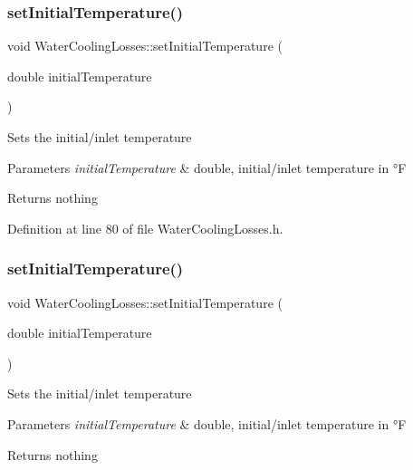\subsubsection{\texorpdfstring{set\+Initial\+Temperature()}{setInitialTemperature()}\hspace{0.1cm}{\footnotesize\ttfamily [2/3]}}
{\footnotesize\ttfamily void Water\+Cooling\+Losses\+::set\+Initial\+Temperature (\begin{DoxyParamCaption}\item[{double}]{initial\+Temperature }\end{DoxyParamCaption})\hspace{0.3cm}{\ttfamily [inline]}}

Sets the initial/inlet temperature


\begin{DoxyParams}{Parameters}
{\em initial\+Temperature} & double, initial/inlet temperature in °F\\
\hline
\end{DoxyParams}
\begin{DoxyReturn}{Returns}
nothing 
\end{DoxyReturn}


Definition at line 80 of file Water\+Cooling\+Losses.\+h.

\mbox{\label{class_water_cooling_losses_a56b0b64b71ecbece780622d5f4b536ba}} 
\subsubsection{\texorpdfstring{set\+Initial\+Temperature()}{setInitialTemperature()}\hspace{0.1cm}{\footnotesize\ttfamily [3/3]}}
{\footnotesize\ttfamily void Water\+Cooling\+Losses\+::set\+Initial\+Temperature (\begin{DoxyParamCaption}\item[{double}]{initial\+Temperature }\end{DoxyParamCaption})\hspace{0.3cm}{\ttfamily [inline]}}

Sets the initial/inlet temperature


\begin{DoxyParams}{Parameters}
{\em initial\+Temperature} & double, initial/inlet temperature in °F\\
\hline
\end{DoxyParams}
\begin{DoxyReturn}{Returns}
nothing 
\end{DoxyReturn}


